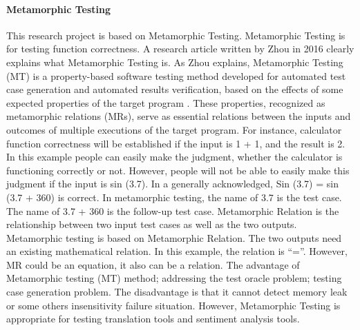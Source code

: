 \documentclass[conference]{IEEEtran}
\begin{document}
\paragraph{Metamorphic Testing}
This research project is based on Metamorphic Testing.
Metamorphic Testing is for testing function correctness.
A research article written by Zhou in 2016 clearly explains what Metamorphic
Testing is.
As Zhou explains, Metamorphic Testing (MT) is a property-based software testing
method developed for automated test case generation and automated results
verification, based on the effects of some expected properties of the target
program \cite{zhou2016metamorphic}.
These properties, recognized as metamorphic relations (MRs), serve as essential
relations between the inputs and outcomes of multiple executions of the target
program.
For instance, calculator function correctness will be established if the input is 1 + 1,
and the result is 2. In this example people can easily make the judgment,
whether the calculator is functioning correctly or not.
However, people will not be able to easily make this judgment if the input is sin (3.7).
In a generally acknowledged, Sin (3.7) = sin (3.7 + 360) is correct.
In metamorphic testing, the name of 3.7 is the test case. The name of 3.7 + 360
is the follow-up test case.
Metamorphic Relation is the relationship between two input test cases as well as
the two outputs.
Metamorphic testing is based on Metamorphic Relation.
The two outputs need an existing mathematical relation.
In this example, the relation is “=”. However, MR could be an equation,
it also can be a relation.
The advantage of Metamorphic testing (MT) method; addressing the test oracle
problem; testing case generation problem.
The disadvantage is that it cannot detect memory leak or some others insensitivity
failure situation.
However, Metamorphic Testing is appropriate for testing translation tools and
sentiment analysis tools.
\end{document}
